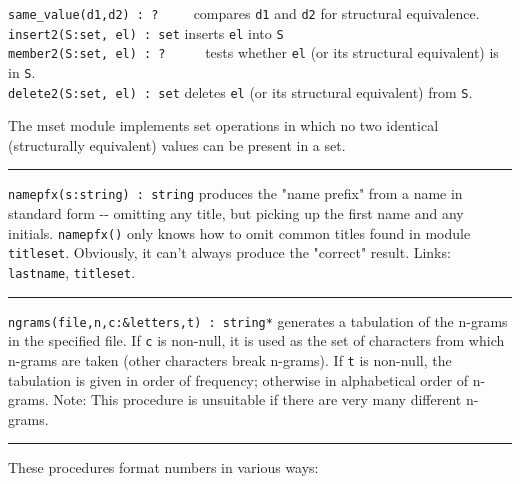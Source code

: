 \texttt{same\_value(d1,d2) : ? \ }\ \ \ compares \texttt{d1} and
\texttt{d2} for structural equivalence.\\
\texttt{insert2(S:set, el) : set} inserts \texttt{el} into \texttt{S}
\\
\texttt{member2(S:set, el) : ?} \ \ \ \ \ tests whether \texttt{el} (or
its structural equivalent) is in \texttt{S}.\\
\texttt{delete2(S:set, el) : set} deletes \texttt{el} (or its structural
equivalent) from \texttt{S}.

The mset module implements set operations in which no two identical
(structurally equivalent) values can be present in a set.

\vspace{0.25cm}\hrule{}

\texttt{namepfx(s:string) : string} produces the "name
prefix" from a name in standard form -{}- omitting any
title, but picking up the first name and any initials.
\texttt{namepfx()} only knows how to omit common titles found in module
\texttt{titleset}. Obviously, it can't always produce
the "correct" result. Links:
\texttt{lastname}, \texttt{titleset}. 

\vspace{0.25cm}\hrule{}

\texttt{ngrams(file,n,c:\&letters,t) : string*} generates a tabulation
of the n-grams in the specified file. If \texttt{c} is non-null, it is
used as the set of characters from which n-grams are
taken (other characters break n-grams). If \texttt{t} is non-null, the
tabulation is given in order of frequency; otherwise in alphabetical
order of n-grams. Note: This procedure is unsuitable if there are very
many different n-grams. 

\vspace{0.25cm}\hrule{}

These procedures format numbers in various ways:

